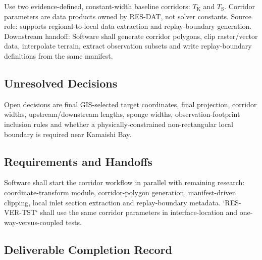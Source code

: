 Use two evidence-defined, constant-width baseline corridors:
$T_{\mathrm{K}}$ and $T_{\mathrm{S}}$. Corridor parameters are data
products owned by RES-DAT, not solver constants. Source role: supports
regional-to-local data extraction and replay-boundary generation.
Downstream handoff: Software shall generate corridor polygons,
clip raster/vector data, interpolate terrain, extract observation
subsets and write replay-boundary definitions from the same manifest.

\subsection{Unresolved Decisions}
\label{sec:res-dat-scn-unresolved-decisions}

Open decisions are final GIS-selected target coordinates, final
projection, corridor widths, upstream/downstream lengths, sponge
widths, observation-footprint inclusion rules and whether a
physically-constrained non-rectangular local boundary is required near
Kamaishi Bay.

\subsection{Requirements and Handoffs}
\label{sec:res-dat-scn-requirements}

Software shall start the corridor workflow in parallel with remaining
research: coordinate-transform module, corridor-polygon generation,
manifest-driven clipping, local inlet section extraction and
replay-boundary metadata. `RES-VER-TST` shall use the same corridor
parameters in interface-location and one-way-versus-coupled tests.

\subsection{Deliverable Completion Record}
\label{sec:res-dat-scn-completion-record}

%
%
%
